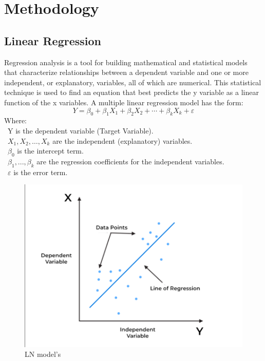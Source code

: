 \documentclass{ieeeojies}
\begin{document}
\section{Methodology}
\subsection{Linear Regression}
Regression analysis is a tool for building mathematical and statistical models that characterize relationships between a dependent variable and one or more independent, or explanatory, variables, all of which are numerical. This statistical technique is used to find an equation that best predicts the y variable as a linear function of the x variables.
A multiple linear regression model has the form: 
\[Y=\beta_0+\beta_1X_1+\beta_2X_2+\cdots+\beta_kX_k+\varepsilon\]
Where:\\
	\indent\textbullet\ Y is the dependent variable (Target Variable).\\
	\indent\textbullet\ \(X_1, X_2, \ldots, X_k\) are the independent (explanatory) variables.\\
	\indent\textbullet\ \(\beta_0\) is the intercept term.\\
	\indent\textbullet\ \(\beta_1,..., \beta_k\) are the regression coefficients for the independent variables.\\
	\indent\textbullet\ \(\varepsilon\) is the error term.

  \begin{figure}[H]
    \centering
    \begin{minipage}{0.8\linewidth}
      \centering
      \includegraphics[width=\linewidth]{bibliography/Figure/LN_model.png}
      \caption{LN model's}
      \label{fig8}
    \end{minipage}
  \end{figure}
\end{document}
